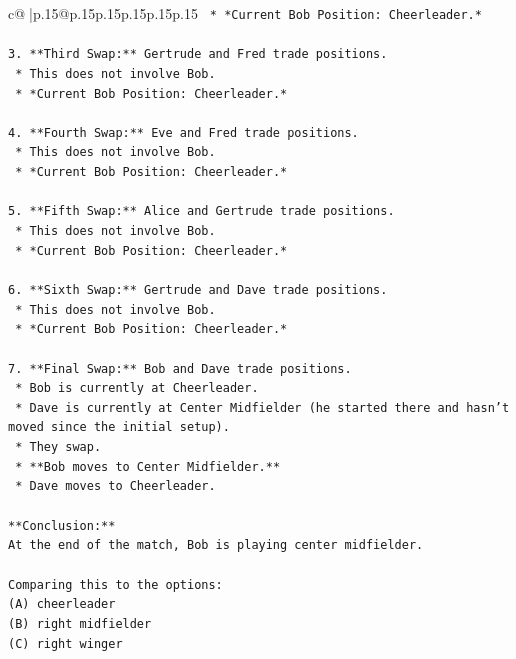 \documentclass{article}
\begin{document}
{\begin{supertabular}{c@{$\;$}|p{.15\linewidth}@{}p{.15\linewidth}p{.15\linewidth}p{.15\linewidth}p{.15\linewidth}p{.15\linewidth}}
{{{\texttt{    *   *Current Bob Position: Cheerleader.*} \\
\\ 
\texttt{3.  **Third Swap:** Gertrude and Fred trade positions.} \\
\texttt{    *   This does not involve Bob.} \\
\texttt{    *   *Current Bob Position: Cheerleader.*} \\
\\ 
\texttt{4.  **Fourth Swap:** Eve and Fred trade positions.} \\
\texttt{    *   This does not involve Bob.} \\
\texttt{    *   *Current Bob Position: Cheerleader.*} \\
\\ 
\texttt{5.  **Fifth Swap:** Alice and Gertrude trade positions.} \\
\texttt{    *   This does not involve Bob.} \\
\texttt{    *   *Current Bob Position: Cheerleader.*} \\
\\ 
\texttt{6.  **Sixth Swap:** Gertrude and Dave trade positions.} \\
\texttt{    *   This does not involve Bob.} \\
\texttt{    *   *Current Bob Position: Cheerleader.*} \\
\\ 
\texttt{7.  **Final Swap:** Bob and Dave trade positions.} \\
\texttt{    *   Bob is currently at Cheerleader.} \\
\texttt{    *   Dave is currently at Center Midfielder (he started there and hasn't moved since the initial setup).} \\
\texttt{    *   They swap.} \\
\texttt{    *   **Bob moves to Center Midfielder.**} \\
\texttt{    *   Dave moves to Cheerleader.} \\
\\ 
\texttt{**Conclusion:**} \\
\texttt{At the end of the match, Bob is playing center midfielder.} \\
\\ 
\texttt{Comparing this to the options:} \\
\texttt{(A) cheerleader} \\
\texttt{(B) right midfielder} \\
\texttt{(C) right winger} \\
}}}
\end{supertabular}}
\end{document}
